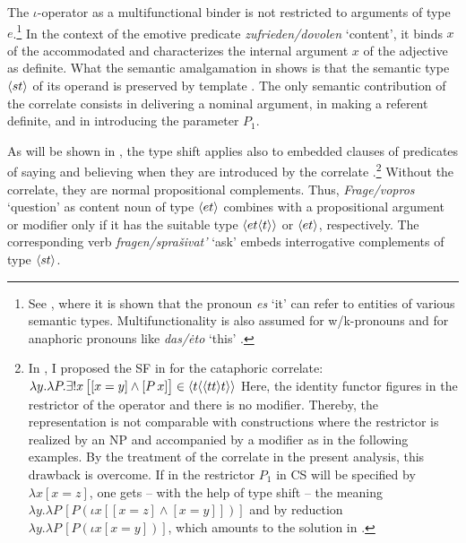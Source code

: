 \documentclass[output=paper,
colorlinks,
citecolor=brown,
newtxmath
]{langscibook}
\begin{document}
\noindent The $\iota$-operator as a multifunctional binder is not restricted to arguments of type $e$.\footnote{See \citet{Zimmermann2016a}, where it is shown that the pronoun \textit{es} `it' can refer to entities of various semantic types. Multifunctionality is also assumed for w/k-pronouns and for anaphoric pronouns like \textit{das/ėto} `this' \citep{Zimmermann2019c}.} In the context of the emotive predicate \textit{zufrieden/dovolen} `content', it binds $x$ of the accommodated  and characterizes the internal argument $x$ of the adjective as definite. What the semantic amalgamation in  shows is that the semantic type $\langle{st}\rangle$ of its operand  is preserved by template . The only semantic contribution of the correlate consists in delivering a nominal argument, in making a referent definite, and in introducing the parameter $P_1$.

As will be shown in , the type shift  applies also to embedded clauses of predicates of saying and believing when they are introduced by the correlate \citep{Zimmermann2016b,Zimmermann2016a, Zimmermann2019a}.\footnote{In \cite[33]{Zimmermann2016a}, I proposed the SF in  for the cataphoric correlate:
\ea\label{ex:cc} $\lambda y . \lambda P .\exists!x \, \big[[x = y] \wedge [P \, x]\big] \in \langle{t\ensuremath{\langle{{\ensuremath{\langle{tt}\rangle} t}}\rangle}}\rangle$ \z
Here, the identity functor figures in the restrictor of the operator and there is no modifier. Thereby, the representation is not comparable with constructions where the restrictor is realized by an NP and accompanied by a modifier as in the following examples. By the treatment of the correlate in the present analysis, this drawback is overcome. If in  the restrictor $P_1$ in CS will be specified by $\lambda x [x = z]$, one gets -- with the help of type shift  -- the meaning $\lambda y . \lambda P \, [P (\iota x[[x = z] \wedge [x = y]])]$ and by reduction $\lambda y . \lambda P \, [P (\iota x [x = y])]$, which amounts to the solution in \cite[33]{Zimmermann2016a}.}
Without the correlate, they are normal propositional complements. Thus, \textit{Frage/vopros} `question' as content noun of type $\langle{et}\rangle$ combines with a propositional argument or modifier only if it has the suitable type $\langle{et\ensuremath{\langle{t}\rangle}}\rangle$ or $\langle{et}\rangle$, respectively. The corresponding verb \textit{fragen/sprašivat'} `ask' embeds interrogative complements of type $\langle{st}\rangle$.


\label{s:2.4.1.2}
\end{document}

